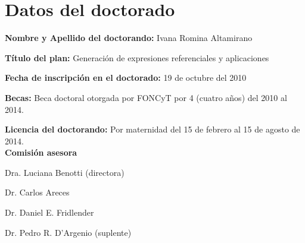 \section{Datos del doctorado}
\label{datos}

{\bf Nombre y Apellido del doctorando:} Ivana Romina Altamirano

{\bf T\'itulo del plan:} Generaci\'on de expresiones referenciales y aplicaciones

{\bf Fecha de inscripci\'on en el doctorado:} 19 de octubre del 2010

{\bf Becas:} Beca doctoral otorgada por FONCyT por 4 (cuatro a\~nos) del 2010 al 2014.  


{\bf Licencia del doctorando:} Por maternidad del 15 de febrero al 15 de agosto de 2014. \\

{\bf Comisi\'on asesora}

Dra. Luciana Benotti (directora)

Dr. Carlos Areces

Dr. Daniel E. Fridlender

Dr. Pedro R. D'Argenio (suplente)


